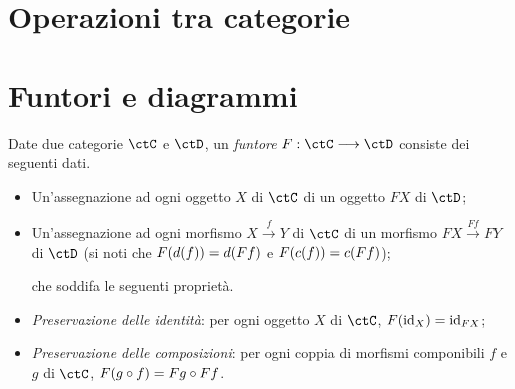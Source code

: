 \section{Operazioni tra categorie}


\section{Funtori e diagrammi}

\begin{definition}[Funtore]\label{def_funtore}
	Date due categorie \(\ctC\) e \(\ctD\), un \emph{funtore} \(F:\ctC\fun\ctD\) consiste dei seguenti dati.
	\begin{itemize}
		\item Un'assegnazione ad ogni oggetto \(X\) di \(\ctC\) di un oggetto \(FX\) di \(\ctD\);
		\item Un'assegnazione ad ogni morfismo \(X \xrightarrow{f} Y\) di \(\ctC\) di un morfismo \(FX \xrightarrow{Ff} FY\) di \(\ctD\) (si noti che \(F(d(f))=d(Ff)\) e \(F(c(f))=c(Ff)\));

		      che soddifa le seguenti proprietà.
		\item \emph{Preservazione delle identità}: per ogni oggetto \(X\) di \(\ctC\), \(F(\mathrm{id}_X)=\mathrm{id}_{FX}\);
		\item \emph{Preservazione delle composizioni}: per ogni coppia di morfismi componibili \(f\) e \(g\) di \(\ctC\), \(F(g\circ f)=Fg\circ Ff\).
	\end{itemize}
\end{definition}



